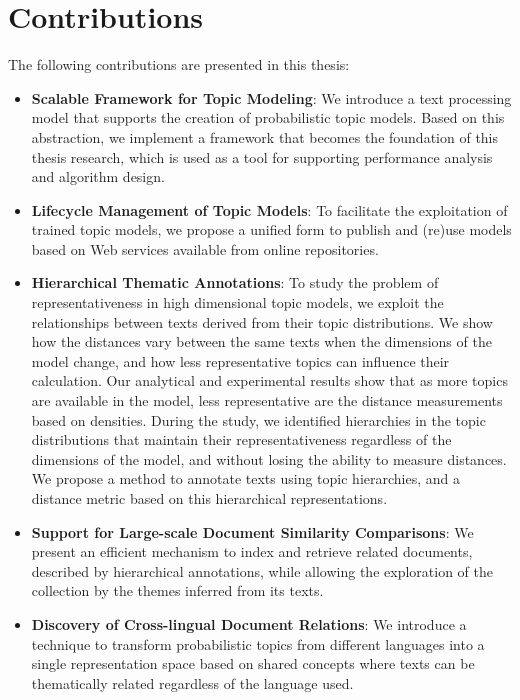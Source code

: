 \section{Contributions}

The following contributions are presented in this thesis:

\begin{itemize}
\item \textbf{Scalable Framework for Topic Modeling}: We introduce a text processing model that supports the creation of probabilistic topic models. Based on this abstraction, we implement a framework that becomes the foundation of this thesis research, which is used as a tool for supporting performance analysis and algorithm design.
\item \textbf{Lifecycle Management of Topic Models}: To facilitate the exploitation of trained topic models, we propose a unified form to publish and (re)use models based on Web services available from online repositories.
\item \textbf{Hierarchical Thematic Annotations}: To study the problem of representativeness in high dimensional topic models, we exploit the relationships between texts derived from their topic distributions. We show how the distances vary between the same texts when the dimensions of the model change, and how less representative topics can influence their calculation. Our analytical and experimental results show that as more topics are available in the model, less representative are the distance measurements based on densities. During the study, we identified hierarchies in the topic distributions that maintain their representativeness regardless of the dimensions of the model, and without losing the ability to measure distances. We propose a method to annotate texts using topic hierarchies, and a distance metric based on this hierarchical representations.
\item \textbf{Support for Large-scale Document Similarity Comparisons}: We present an efficient mechanism to index and retrieve related documents, described by hierarchical annotations, while allowing the exploration of the collection by the themes inferred from its texts.
\item \textbf{Discovery of Cross-lingual Document Relations}: We introduce a technique to transform probabilistic topics from different languages into a single representation space based on shared concepts where texts can be thematically related regardless of the language used.
\end{itemize}

